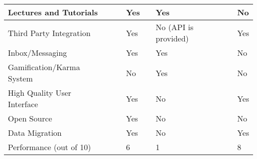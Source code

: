 \begin{table}[ht]
{\begin{tabular}{llllllll}
        \multicolumn{1}{|l|}{Lectures and Tutorials}      & \multicolumn{1}{l|}{} & \multicolumn{1}{l|}{} & \multicolumn{1}{l|}{Yes} & \multicolumn{1}{l|}{} & \multicolumn{1}{l|}{Yes}                       & \multicolumn{1}{l|}{} & \multicolumn{1}{l|}{No} \\ \hline
        \multicolumn{1}{|l|}{Third Party Integration}     & \multicolumn{1}{l|}{} & \multicolumn{1}{l|}{} & \multicolumn{1}{l|}{Yes} & \multicolumn{1}{l|}{} & \multicolumn{1}{l|}{No (API is provided)}      & \multicolumn{1}{l|}{} & \multicolumn{1}{l|}{Yes} \\ \hline
        \multicolumn{1}{|l|}{Inbox/Messaging}             & \multicolumn{1}{l|}{} & \multicolumn{1}{l|}{} & \multicolumn{1}{l|}{Yes} & \multicolumn{1}{l|}{} & \multicolumn{1}{l|}{Yes}                       & \multicolumn{1}{l|}{} & \multicolumn{1}{l|}{No} \\ \hline
        \multicolumn{1}{|l|}{Gamification/Karma System}   & \multicolumn{1}{l|}{} & \multicolumn{1}{l|}{} & \multicolumn{1}{l|}{No} & \multicolumn{1}{l|}{} & \multicolumn{1}{l|}{Yes}                       & \multicolumn{1}{l|}{} & \multicolumn{1}{l|}{No} \\ \hline
        \multicolumn{1}{|l|}{High Quality User Interface} & \multicolumn{1}{l|}{} & \multicolumn{1}{l|}{} & \multicolumn{1}{l|}{Yes} & \multicolumn{1}{l|}{} & \multicolumn{1}{l|}{No}                        & \multicolumn{1}{l|}{} & \multicolumn{1}{l|}{Yes} \\ \hline
        \multicolumn{1}{|l|}{Open Source}                 & \multicolumn{1}{l|}{} & \multicolumn{1}{l|}{} & \multicolumn{1}{l|}{Yes} & \multicolumn{1}{l|}{} & \multicolumn{1}{l|}{No}                        & \multicolumn{1}{l|}{} & \multicolumn{1}{l|}{No} \\ \hline
        \multicolumn{1}{|l|}{Data Migration}              & \multicolumn{1}{l|}{} & \multicolumn{1}{l|}{} & \multicolumn{1}{l|}{Yes} & \multicolumn{1}{l|}{} & \multicolumn{1}{l|}{No}                        & \multicolumn{1}{l|}{} & \multicolumn{1}{l|}{Yes} \\ \hline
        Performance (out of 10)                           &                       &                       & 6                      &                       & 1                                              &                       & 8                      \\ \hline
    \end{tabular}}
\end{table}




